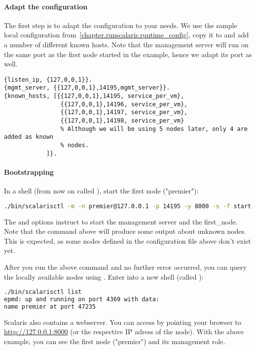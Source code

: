 \paragraph{Adapt the configuration}
The first step is to adapt the configuration to your needs. We use the sample local
configuration from~\ref{chapter.runscalaris.runtime_config}, copy it to  and add a number of different known
hosts. Note that the management server will run on the same port as the first node started
in the example, hence we adapt its port as well.

\begin{lstlisting}
{listen_ip, {127,0,0,1}}.
{mgmt_server, {{127,0,0,1},14195,mgmt_server}}.
{known_hosts, [{{127,0,0,1},14195, service_per_vm},
                {{127,0,0,1},14196, service_per_vm},
                {{127,0,0,1},14197, service_per_vm},
                {{127,0,0,1},14198, service_per_vm}
                % Although we will be using 5 nodes later, only 4 are added as known
                % nodes.
            ]}.
\end{lstlisting}

\paragraph{Bootstrapping}
\label{par:Bootstrapping}

In a shell (from now on called ), start the first node ("premier"):
\begin{lstlisting}[language=sh]
./bin/scalarisctl -m -n premier@127.0.0.1 -p 14195 -y 8000 -s -f start
\end{lstlisting}
The  and  options instruct  to start the
management server and the first\_node. Note that the command above will produce some
output about unknown nodes. This is expected, as some nodes defined in the configuration
file above don't exist yet.

After you run the above command and no further error occurred, you can query the locally
available nodes using . Enter into a new shell (called ):
\begin{lstlisting}[language=sh]
./bin/scalarisctl list
epmd: up and running on port 4369 with data:
name premier at port 47235
\end{lstlisting}

Scalaris also contains a webserver. You can access by pointing your browser to 
\url{http://127.0.0.1:8000} (or the respective IP adress of the node). With the above example,
you can see the first node ("premier") and its management role.

